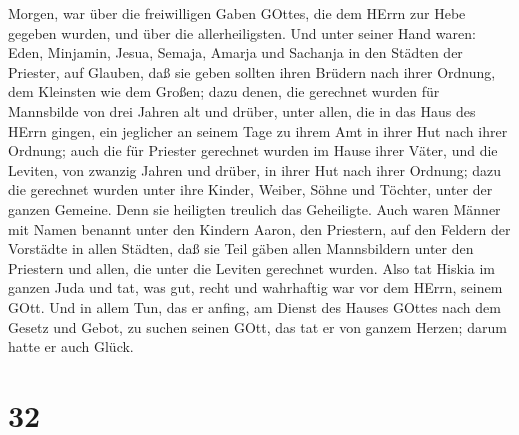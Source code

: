 Morgen, war über die freiwilligen Gaben GOttes, die dem HErrn zur Hebe
gegeben wurden, und über die allerheiligsten.  Und unter
seiner Hand waren: Eden, Minjamin, Jesua, Semaja, Amarja und Sachanja in
den Städten der Priester, auf Glauben, daß sie geben sollten ihren
Brüdern nach ihrer Ordnung, dem Kleinsten wie dem Großen; 
dazu denen, die gerechnet wurden für Mannsbilde von drei Jahren alt und
drüber, unter allen, die in das Haus des HErrn gingen, ein jeglicher an
seinem Tage zu ihrem Amt in ihrer Hut nach ihrer Ordnung; 
auch die für Priester gerechnet wurden im Hause ihrer Väter, und die
Leviten, von zwanzig Jahren und drüber, in ihrer Hut nach ihrer Ordnung;
 dazu die gerechnet wurden unter ihre Kinder, Weiber, Söhne
und Töchter, unter der ganzen Gemeine. Denn sie heiligten treulich das
Geheiligte.  Auch waren Männer mit Namen benannt unter den
Kindern Aaron, den Priestern, auf den Feldern der Vorstädte in allen
Städten, daß sie Teil gäben allen Mannsbildern unter den Priestern und
allen, die unter die Leviten gerechnet wurden.  Also tat
Hiskia im ganzen Juda und tat, was gut, recht und wahrhaftig war vor dem
HErrn, seinem GOtt.  Und in allem Tun, das er anfing, am
Dienst des Hauses GOttes nach dem Gesetz und Gebot, zu suchen seinen
GOtt, das tat er von ganzem Herzen; darum hatte er auch Glück.

\hypertarget{section-31}{%
\section{32}\label{section-31}}

